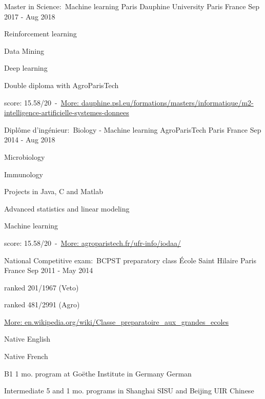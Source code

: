 \documentclass[11pt, a4paper]{awesome-cv}
\begin{document}
\begin{cventries}
\cventry
{Master in Science:~Machine learning}
{Paris Dauphine University}
{Paris France}
{Sep 2017 - Aug 2018}
{
\begin{cvitems}
\item{Reinforcement learning}
\item{Data Mining}
\item{Deep learning}
\item{Double diploma with AgroParisTech}
\item{score: 15.58/20~-~\href{https://dauphine.psl.eu/formations/masters/informatique/m2-intelligence-artificielle-systemes-donnees}{More: \tiny{dauphine.psl.eu/formations/masters/informatique/m2-intelligence-artificielle-systemes-donnees}}}
\end{cvitems}
}


\cventry
{Diplôme d'ingénieur:~Biology - Machine learning}
{AgroParisTech}
{Paris France}
{Sep 2014 - Aug 2018}
{
\begin{cvitems}
\item{Microbiology}
\item{Immunology}
\item{Projects in Java, C and Matlab}
\item{Advanced statistics and linear modeling}
\item{Machine learning}
\item{score: 15.58/20~-~\href{http://www.agroparistech.fr/ufr-info/iodaa/}{More: \tiny{agroparistech.fr/ufr-info/iodaa/}}}
\end{cvitems}
}


\cventry
{National Competitive exam:~BCPST preparatory class}
{École Saint Hilaire}
{Paris France}
{Sep 2011 - May 2014}
{
\begin{cvitems}
\item{ranked 201/1967 (Veto)}
\item{ranked 481/2991 (Agro)}
\item{\href{https://en.wikipedia.org/wiki/Classe_preparatoire_aux_grandes_ecoles}{More: \tiny{en.wikipedia.org/wiki/Classe\_preparatoire\_aux\_grandes\_ecoles}}}
\end{cvitems}
}
\end{cventries}
\begin{cvhonors}
\cvhonor
{Native}
{}
{}
{English}

\cvhonor
{Native}
{}
{}
{French}

\cvhonor
{B1}
{1 mo. program at Goëthe Institute in Germany}
{}
{German}

\cvhonor
{Intermediate}
{5 and 1 mo. programs in Shanghai SISU and Beijing UIR}
{}
{Chinese}
\end{cvhonors}
\end{document}
